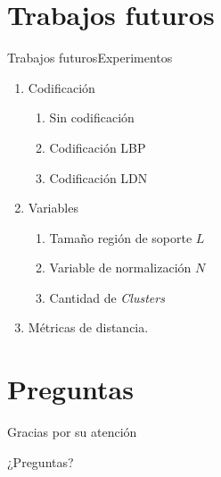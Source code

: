 \documentclass{beamer}
\begin{document}
\section{Trabajos futuros}
        \begin{frame}{Trabajos futuros}{Experimentos}
			\begin{enumerate}
				\item Codificación
					\begin{enumerate}
						\item Sin codificación
						\item Codificación LBP
						\item Codificación LDN
					\end{enumerate}
				\item Variables
					\begin{enumerate}
						\item Tamaño región de soporte $L$
						\item Variable de normalización $N$
						\item Cantidad de \textit{Clusters}
					\end{enumerate}
				\item Métricas de distancia.
			\end{enumerate}					        
        \end{frame}
    



\section*{Preguntas}
	\begin{frame}{Gracias por su atención}
		\begin{center}
			¿Preguntas?
		\end{center}
	\end{frame}
	
\end{document}
